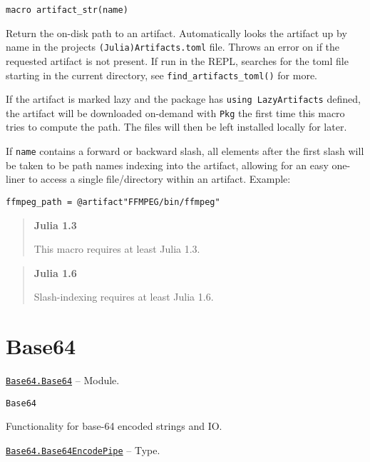 \begin{adjustwidth}{2em}{0pt}


\begin{verbatim}
macro artifact_str(name)
\end{verbatim}

Return the on-disk path to an artifact. Automatically looks the artifact up by name in the project{\textquotesingle}s \texttt{(Julia)Artifacts.toml} file. Throws an error on if the requested artifact is not present. If run in the REPL, searches for the toml file starting in the current directory, see \texttt{find\_artifacts\_toml()} for more.

If the artifact is marked {\textquotedbl}lazy{\textquotedbl} and the package has \texttt{using LazyArtifacts} defined, the artifact will be downloaded on-demand with \texttt{Pkg} the first time this macro tries to compute the path. The files will then be left installed locally for later.

If \texttt{name} contains a forward or backward slash, all elements after the first slash will be taken to be path names indexing into the artifact, allowing for an easy one-liner to access a single file/directory within an artifact.  Example:


\begin{lstlisting}
ffmpeg_path = @artifact"FFMPEG/bin/ffmpeg"
\end{lstlisting}

\begin{quote}
\textbf{Julia 1.3}

This macro requires at least Julia 1.3.

\end{quote}
\begin{quote}
\textbf{Julia 1.6}

Slash-indexing requires at least Julia 1.6.

\end{quote}


\end{adjustwidth}

\hypertarget{11756231791819393325}{}


\chapter{Base64}


\hypertarget{6529833673026929543}{}
\hyperlink{6529833673026929543}{\texttt{Base64.Base64}}  -- {Module.}

\begin{adjustwidth}{2em}{0pt}


\begin{verbatim}
Base64
\end{verbatim}

Functionality for base-64 encoded strings and IO.



\end{adjustwidth}
\hypertarget{3718432815614240925}{}
\hyperlink{3718432815614240925}{\texttt{Base64.Base64EncodePipe}}  -- {Type.}

